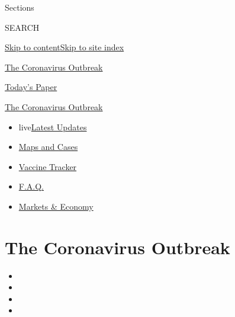 Sections

SEARCH

\protect\hyperlink{site-content}{Skip to
content}\protect\hyperlink{site-index}{Skip to site index}

\href{https://www.nytimes.com/news-event/coronavirus}{The Coronavirus
Outbreak}

\href{https://myaccount.nytimes.com/auth/login?response_type=cookie\&client_id=vi}{}

\href{https://www.nytimes.com/section/todayspaper}{Today's Paper}

\href{https://www.nytimes.com/news-event/coronavirus?action=click\&pgtype=Article\&state=default\&region=TOP_BANNER\&context=storylines_menu}{The
Coronavirus Outbreak}

\begin{itemize}
\tightlist
\item
  live\href{https://www.nytimes.com/2020/08/08/world/coronavirus-updates.html?action=click\&pgtype=Article\&state=default\&region=TOP_BANNER\&context=storylines_menu}{Latest
  Updates}
\item
  \href{https://www.nytimes.com/interactive/2020/us/coronavirus-us-cases.html?action=click\&pgtype=Article\&state=default\&region=TOP_BANNER\&context=storylines_menu}{Maps
  and Cases}
\item
  \href{https://www.nytimes.com/interactive/2020/science/coronavirus-vaccine-tracker.html?action=click\&pgtype=Article\&state=default\&region=TOP_BANNER\&context=storylines_menu}{Vaccine
  Tracker}
\item
  \href{https://www.nytimes.com/interactive/2020/world/coronavirus-tips-advice.html?action=click\&pgtype=Article\&state=default\&region=TOP_BANNER\&context=storylines_menu}{F.A.Q.}
\item
  \href{https://www.nytimes.com/live/2020/08/07/business/stock-market-today-coronavirus?action=click\&pgtype=Article\&state=default\&region=TOP_BANNER\&context=storylines_menu}{Markets
  \& Economy}
\end{itemize}

\hypertarget{the-coronavirus-outbreak}{%
\section{The Coronavirus Outbreak}\label{the-coronavirus-outbreak}}

\begin{itemize}
\item
\item
\item
\item
\end{itemize}

